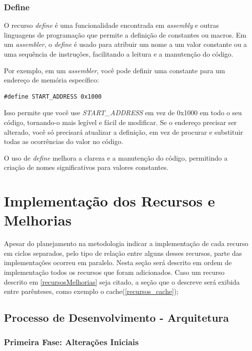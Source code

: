 \documentclass[
	12pt,				%
	openright,			%
	oneside,			%
	a4paper,			%
	english,			%
	french,				%
	spanish,			%
	brazil,				%
	]{abntex2}
\begin{document}
\subsubsection{Define}\label{recursos_define}

O recurso \textit{define} é uma funcionalidade encontrada em \textit{assembly} e outras linguagens de programação que permite a definição de constantes ou macros. Em um \textit{assembler}, o \textit{define} é usado para atribuir um nome a um valor constante ou a uma sequência de instruções, facilitando a leitura e a manutenção do código.

Por exemplo, em um \textit{assembler}, você pode definir uma constante para um endereço de memória específico:

\begin{lstlisting}
#define START_ADDRESS 0x1000
\end{lstlisting}

Isso permite que você use \textit{START\_ADDRESS} em vez de 0x1000 em todo o seu código, tornando-o mais legível e fácil de modificar. Se o endereço precisar ser alterado, você só precisará atualizar a definição, em vez de procurar e substituir todas as ocorrências do valor no código.

O uso de \textit{define} melhora a clareza e a manutenção do código, permitindo a criação de nomes significativos para valores constantes.

\section{Implementação dos Recursos e Melhorias}

Apesar do planejamento na metodologia indicar a implementação de cada recurso em ciclos separados, pelo tipo de relação entre alguns desses recursos, parte das implementações ocorreu em paralelo. Nesta seção será descrito em ordem de implementação todos os recursos que foram adicionados. Caso um recurso descrito em \ref{recursosMelhorias} seja citado, a seção que o descreve será exibida entre parênteses, como exemplo o cache(\ref{recursos_cache});

\subsection{Processo de Desenvolvimento - Arquitetura}

\subsubsection{Primeira Fase: Alterações Iniciais}
\end{document}
